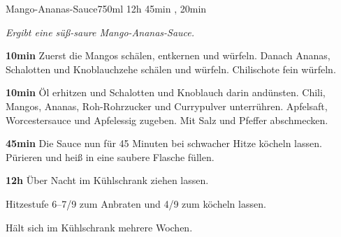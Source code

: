 \documentclass[../recipe-collections/cooking.tex]{subfiles}
\begin{document}
\begin{recipe}{Mango-Ananas-Sauce}{750ml }{12h 45min , 20min }

  \freeform{}\textit{Ergibt eine süß-saure Mango-Ananas-Sauce.}


  \textbf{10min}
  Zuerst die Mangos schälen, entkernen und würfeln.
  Danach Ananas, Schalotten und Knoblauchzehe schälen und würfeln.
  Chilischote fein würfeln.


  \textbf{10min}
  Öl erhitzen und Schalotten und Knoblauch darin andünsten.
  Chili, Mangos, Ananas, Roh-Rohrzucker und Currypulver unterrühren.
  Apfelsaft, Worcestersauce und Apfelessig zugeben.
  Mit Salz und Pfeffer abschmecken.

  \newstep{}\textbf{45min}
  Die Sauce nun für 45 Minuten bei schwacher Hitze köcheln lassen.
  Pürieren und heiß in eine saubere Flasche füllen.

  \newstep{}\textbf{12h}
  Über Nacht im Kühlschrank ziehen lassen.

  \freeform{}\hrulefill{}

  \freeform{}
  Hitzestufe 6–7/9 zum Anbraten und 4/9 zum köcheln lassen.

  \freeform{}
  Hält sich im Kühlschrank mehrere Wochen.

\end{recipe}
\end{document}
